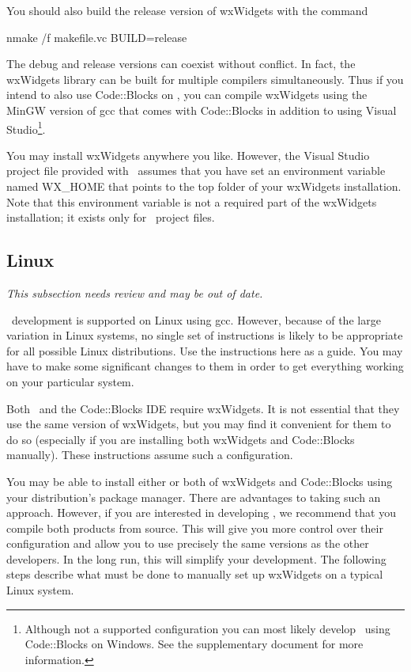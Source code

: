 You should also build the release version of wxWidgets with the command

\begin{commands}
nmake /f makefile.vc BUILD=release
\end{commands}

The debug and release versions can coexist without conflict. In fact, the wxWidgets library can
be built for multiple compilers simultaneously. Thus if you intend to also use Code::Blocks on
\MapEditor, you can compile wxWidgets using the MinGW version of gcc that comes with
Code::Blocks in addition to using Visual Studio\footnote{Although not a supported configuration
  you can most likely develop \MapEditor\ using Code::Blocks on Windows. See the supplementary
  document  for more information.}.

You may install wxWidgets anywhere you like. However, the Visual Studio project file provided
with \MapEditor\ assumes that you have set an environment variable named WX\_HOME that points to
the top folder of your wxWidgets installation. Note that this environment variable is not a
required part of the wxWidgets installation; it exists only for \MapEditor\ project files.

\subsection{Linux}

\textit{This subsection needs review and may be out of date.}

\MapEditor\ development is supported on Linux using gcc. However, because of the large variation
in Linux systems, no single set of instructions is likely to be appropriate for all possible
Linux distributions. Use the instructions here as a guide. You may have to make some significant
changes to them in order to get everything working on your particular system.

Both \MapEditor\ and the Code::Blocks IDE require wxWidgets. It is not essential that they use
the same version of wxWidgets, but you may find it convenient for them to do so (especially if
you are installing both wxWidgets and Code::Blocks manually). These instructions assume such a
configuration.

You may be able to install either or both of wxWidgets and Code::Blocks using your
distribution's package manager. There are advantages to taking such an approach. However, if you
are interested in developing \VTank, we recommend that you compile both products from source.
This will give you more control over their configuration and allow you to use precisely the same
versions as the other \VTank developers. In the long run, this will simplify your development.
The following steps describe what must be done to manually set up wxWidgets on a typical Linux
system.

